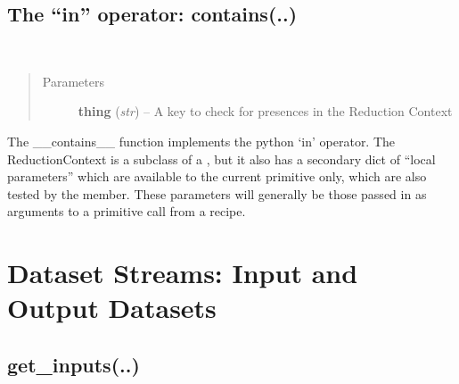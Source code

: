 \documentclass[letterpaper,10pt,english]{sphinxmanual}
\begin{document}
\subsection{The ``in'' operator: contains(..)}
\label{chapter_ReductionContextClass:the-in-operator-contains}

\begin{fulllineitems}
\label{chapter_ReductionContextClass:astrodata.RecipeManager.ReductionContext.__contains__}~\begin{quote}\begin{description}
\item[{Parameters}] \leavevmode
\textbf{thing} (\emph{str}) -- A key to check for presences in the Reduction Context

\end{description}\end{quote}

The \_\_contains\_\_ function implements the python `in' operator. The 
ReductionContext is a subclass of a , but it also has a secondary
dict of ``local parameters'' which are available to the current primitive         only, which are also tested by the  member.
These parameters will generally be those passed in as arguments
to a primitive call from a recipe.

\end{fulllineitems}



\section{Dataset Streams: Input and Output Datasets}
\label{chapter_ReductionContextClass:dataset-streams-input-and-output-datasets}

\subsection{get\_inputs(..)}
\label{chapter_ReductionContextClass:get-inputs}
\end{document}
